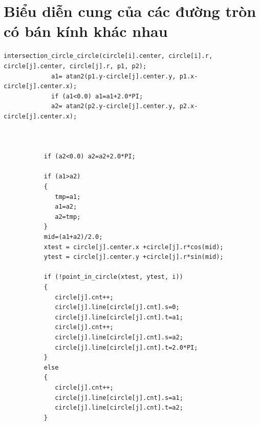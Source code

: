 \documentclass[11pt]{article}
\begin{document}
\section{Biểu diễn cung của các đường tròn có bán kính khác nhau}
\begingroup
\scriptsize
\begin{verbatim}
intersection_circle_circle(circle[i].center, circle[i].r, circle[j].center, circle[j].r, p1, p2);
             a1= atan2(p1.y-circle[j].center.y, p1.x-circle[j].center.x);
             if (a1<0.0) a1=a1+2.0*PI;
             a2= atan2(p2.y-circle[j].center.y, p2.x-circle[j].center.x);



           if (a2<0.0) a2=a2+2.0*PI;

           if (a1>a2)
           {
              tmp=a1;
              a1=a2;
              a2=tmp;
           }
           mid=(a1+a2)/2.0;
           xtest = circle[j].center.x +circle[j].r*cos(mid);
           ytest = circle[j].center.y +circle[j].r*sin(mid);

           if (!point_in_circle(xtest, ytest, i))
           {
              circle[j].cnt++;
              circle[j].line[circle[j].cnt].s=0;
              circle[j].line[circle[j].cnt].t=a1;
              circle[j].cnt++;
              circle[j].line[circle[j].cnt].s=a2;
              circle[j].line[circle[j].cnt].t=2.0*PI;
           }
           else
           {
              circle[j].cnt++;
              circle[j].line[circle[j].cnt].s=a1;
              circle[j].line[circle[j].cnt].t=a2;
           }



\end{verbatim}
\endgroup
\end{document}
